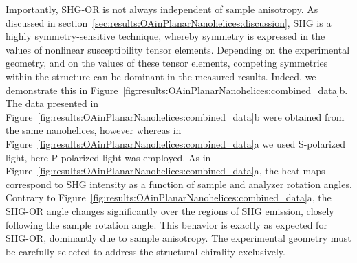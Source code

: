 Importantly, SHG-OR is not always independent of sample anisotropy. As discussed in section~\ref{sec:results:OAinPlanarNanohelices:discussion}, SHG is a highly symmetry-sensitive technique, whereby symmetry is expressed in the values of nonlinear susceptibility tensor elements. Depending on the experimental geometry, and on the values of these tensor elements, competing symmetries within the structure can be dominant in the measured results. Indeed, we demonstrate this in Figure~\ref{fig:results:OAinPlanarNanohelices:combined_data}b. The data presented in Figure~\ref{fig:results:OAinPlanarNanohelices:combined_data}b were obtained from the same nanohelices, however whereas in Figure~\ref{fig:results:OAinPlanarNanohelices:combined_data}a we used S-polarized light, here P-polarized light was employed. As in Figure~\ref{fig:results:OAinPlanarNanohelices:combined_data}a, the heat maps correspond to SHG intensity as a function of sample and analyzer rotation angles. Contrary to Figure~\ref{fig:results:OAinPlanarNanohelices:combined_data}a, the SHG-OR angle changes significantly over the regions of SHG emission, closely following the sample rotation angle. This behavior is exactly as expected for SHG-OR, dominantly due to sample anisotropy. The experimental geometry must be carefully selected to address the structural chirality exclusively.

